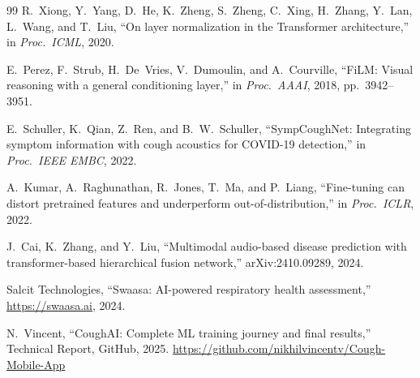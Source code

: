 \documentclass[journal]{IEEEtran}
\begin{document}
\begin{thebibliography}{99}
R.~Xiong, Y.~Yang, D.~He, K.~Zheng, S.~Zheng, C.~Xing,
H.~Zhang, Y.~Lan, L.~Wang, and T.~Liu,
``On layer normalization in the Transformer architecture,''
in \emph{Proc.\ ICML}, 2020.

E.~Perez, F.~Strub, H.~De~Vries, V.~Dumoulin, and A.~Courville,
``FiLM: Visual reasoning with a general conditioning layer,''
in \emph{Proc.\ AAAI}, 2018, pp.~3942--3951.

E.~Schuller, K.~Qian, Z.~Ren, and B.~W.~Schuller,
``SympCoughNet: Integrating symptom information with cough acoustics
for COVID-19 detection,''
in \emph{Proc.\ IEEE EMBC}, 2022.

A.~Kumar, A.~Raghunathan, R.~Jones, T.~Ma, and P.~Liang,
``Fine-tuning can distort pretrained features and underperform out-of-distribution,''
in \emph{Proc.\ ICLR}, 2022.

J.~Cai, K.~Zhang, and Y.~Liu,
``Multimodal audio-based disease prediction with transformer-based
hierarchical fusion network,'' arXiv:2410.09289, 2024.

Salcit Technologies,
``Swaasa: AI-powered respiratory health assessment,''
\url{https://swaasa.ai}, 2024.

N.~Vincent,
``CoughAI: Complete ML training journey and final results,''
Technical Report, GitHub, 2025.
\url{https://github.com/nikhilvincentv/Cough-Mobile-App}

\end{thebibliography}
\end{document}
